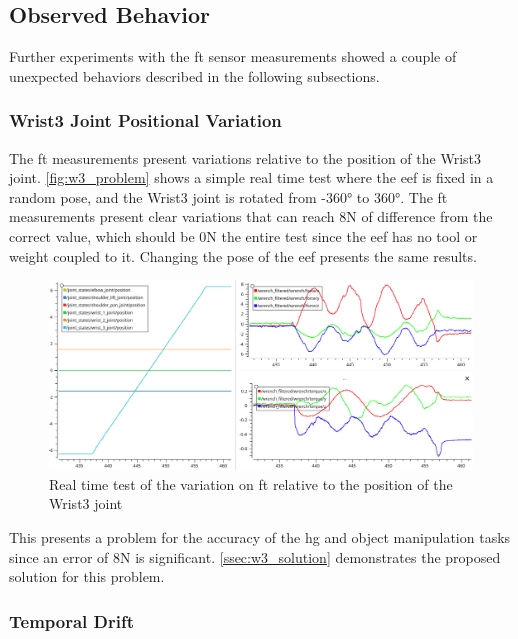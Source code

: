 \subsection{Observed Behavior}

\par Further experiments with the \ac{ft} sensor measurements showed a couple of unexpected behaviors described in the following subsections.

\subsubsection{Wrist3 Joint Positional Variation}

\par The \ac{ft} measurements present variations relative to the position of the Wrist3 joint. \autoref{fig:w3_problem} shows a simple real time test where the \ac{eef} is fixed in a random pose, and the Wrist3 joint is rotated from \ang{-360} to \ang{360}. The \ac{ft} measurements present clear variations that can reach 8N of difference from the correct value, which should be 0N the entire test since the \ac{eef} has no tool or weight coupled to it. Changing the pose of the \ac{eef} presents the same results. 

\begin{figure}[h]
    \centering
    \includegraphics[width=0.9\linewidth]{figs/chp3/wrist_3_problem.png}
    \caption{Real time test of the variation on \ac{ft} relative to the position of the Wrist3 joint}
    \label{fig:w3_problem}
\end{figure}

\par This presents a problem for the accuracy of the \ac{hg} and object manipulation tasks since an error of 8N is significant. \autoref{ssec:w3_solution} demonstrates the proposed solution for this problem.

\subsubsection{Temporal Drift}

